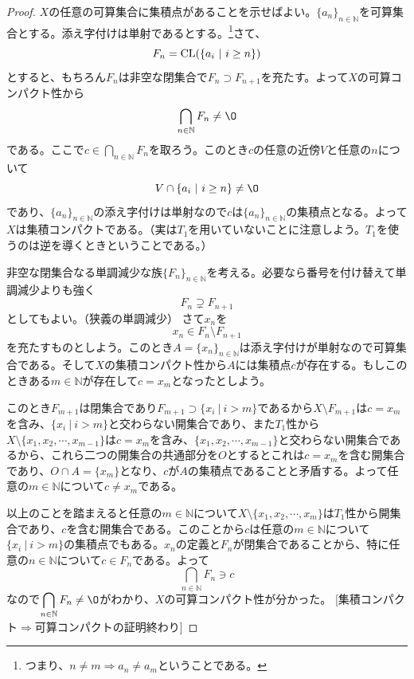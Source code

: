\documentclass{jsarticle}
\newcommand{\cl}{\text{{\rm CL}}}
\begin{document}
\begin{proof}\par
[可算コンパクト$\Longrightarrow$集積コンパクトの証明]\par
$X$の任意の可算集合に集積点があることを示せばよい。$\{a_n\}_{n\in \mathbb{N}}$を可算集合とする。添え字付けは単射であるとする。\footnote{つまり、$n\neq m\Longrightarrow a_n\neq a_m$ということである。}さて、
\[
F_n=\cl(\{a_i\ |\ i\ge n\})
\]
とすると、もちろん$F_n$は非空な閉集合で$F_n\supset F_{n+1}$を充たす。よって$X$の可算コンパクト性から
\[
\bigcap_{n\in \mathbb{N}}F_n\neq\O
\]
である。ここで$\displaystyle c \in \bigcap_{n\in \mathbb{N}}F_n$を取ろう。このとき$c$の任意の近傍$V$と任意の$n$について
\[
V\cap \{a_i\ |\ i\ge n\}\neq\O
\]
であり、$\{a_n\}_{n\in \mathbb{N}}$の添え字付けは単射なので$c$は$\{a_n\}_{n\in \mathbb{N}}$の集積点となる。よって$X$は集積コンパクトである。（実は$T_1$を用いていないことに注意しよう。$T_1$を使うのは逆を導くときということである。）\par
[可算コンパクト$\Longrightarrow$集積コンパクトの証明終わり]\par
[集積コンパクト$\Longrightarrow$可算コンパクトの証明]\par
非空な閉集合なる単調減少な族$\{F_n\}_{n\in \mathbb{N}}$を考える。必要なら番号を付け替えて単調減少よりも強く
\[
F_n\supsetneq F_{n+1}
\]
としてもよい。（狭義の単調減少）
さて$x_n$を
\[
x_n\in F_n\setminus F_{n+1}
\]
を充たすものとしよう。このとき$A=\{x_n\}_{n\in\mathbb{N}}$は添え字付けが単射なので可算集合である。そして$X$の集積コンパクト性から$A$には集積点$c$が存在する。もしこのときある$m\in \mathbb{N}$が存在して$c=x_m$となったとしよう。
\par このとき$F_{m+1}$は閉集合であり$F_{m+1}\supset\{x_{i}\ |\ i>m\}$であるから$X\setminus F_{m+1}$は$c=x_m$を含み、$\{x_{i}\ |\ i>m\}$と交わらない開集合であり、また$T_1$性から$X\setminus \{x_1,x_2,\cdots ,x_{m-1}\}$は$c=x_m$を含み、$\{x_1,x_2,\cdots ,x_{m-1}\}$と交わらない開集合であるから、これら二つの開集合の共通部分を$O$とするとこれは$c=x_m$を含む開集合であり、$O\cap A=\{x_m\}$となり、$c$が$A$の集積点であることと矛盾する。よって任意の$m\in \mathbb{N}$について$c\neq x_m$である。\par
以上のことを踏まえると任意の$m\in \mathbb{N}$について$X\setminus \{x_1,x_2,\cdots ,x_{m}\}$は$T_1$性から開集合であり、$c$を含む開集合である。このことから$c$は任意の$m\in \mathbb{N}$について$\{x_i\ |\ i>m\}$の集積点でもある。$x_n$の定義と$F_n$が閉集合であることから、特に任意の$n\in \mathbb{N}$について$c\in F_n$である。よって
\[
\bigcap_{n\in \mathbb{N}}F_n\ni c
\]
なので$\displaystyle \bigcap_{n\in \mathbb{N}}F_n\neq \O$がわかり、$X$の可算コンパクト性が分かった。
[集積コンパクト$\Longrightarrow$可算コンパクトの証明終わり]
\end{proof}
\end{document}
